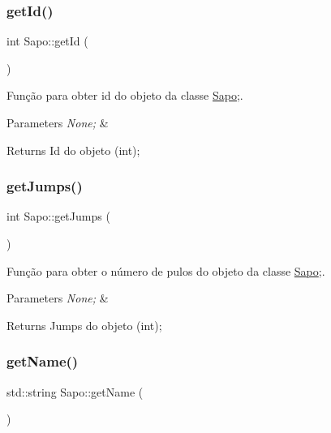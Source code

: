\subsubsection{\texorpdfstring{get\+Id()}{getId()}}
{\footnotesize\ttfamily int Sapo\+::get\+Id (\begin{DoxyParamCaption}{ }\end{DoxyParamCaption})}



Função para obter id do objeto da classe \mbox{\hyperlink{class_sapo}{Sapo}};. 


\begin{DoxyParams}{Parameters}
{\em None;} & \\
\hline
\end{DoxyParams}
\begin{DoxyReturn}{Returns}
Id do objeto (int); 
\end{DoxyReturn}
\mbox{\label{class_sapo_aad9cfa6f83b9e31c677bca925d03a48f}} 
\subsubsection{\texorpdfstring{get\+Jumps()}{getJumps()}}
{\footnotesize\ttfamily int Sapo\+::get\+Jumps (\begin{DoxyParamCaption}{ }\end{DoxyParamCaption})}



Função para obter o número de pulos do objeto da classe \mbox{\hyperlink{class_sapo}{Sapo}};. 


\begin{DoxyParams}{Parameters}
{\em None;} & \\
\hline
\end{DoxyParams}
\begin{DoxyReturn}{Returns}
Jumps do objeto (int); 
\end{DoxyReturn}
\mbox{\label{class_sapo_a90b46ac8008b39dc442927f0114b67aa}} 
\subsubsection{\texorpdfstring{get\+Name()}{getName()}}
{\footnotesize\ttfamily std\+::string Sapo\+::get\+Name (\begin{DoxyParamCaption}{ }\end{DoxyParamCaption})}



